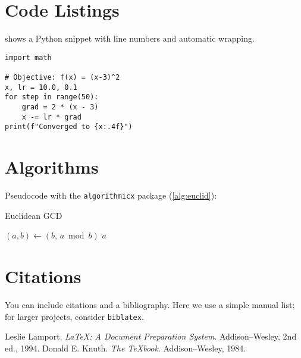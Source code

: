 \documentclass[11pt]{article}
\begin{document}
\section{Code Listings}
 shows a Python snippet with line numbers and automatic wrapping.
\begin{lstlisting}[caption={Tiny gradient descent in Python.},label={lst:python}]
import math

# Objective: f(x) = (x-3)^2
x, lr = 10.0, 0.1
for step in range(50):
    grad = 2 * (x - 3)
    x -= lr * grad
print(f"Converged to {x:.4f}")
\end{lstlisting}

\section{Algorithms}
Pseudocode with the \texttt{algorithmicx} package (\cref{alg:euclid}):
\begin{algorithm}[h]
  \caption{Euclidean GCD}\label{alg:euclid}
  \begin{algorithmic}[1]
        \State $(a,b) \gets (b,\, a \bmod b)$
      \EndWhile
      \State \Return $a$
    \EndProcedure
  \end{algorithmic}
\end{algorithm}

\section{Citations}
You can include citations and a bibliography. Here we use a simple manual list; for larger projects, consider \texttt{biblatex}.

\begin{thebibliography}{9}
 Leslie Lamport. \emph{\LaTeX: A Document Preparation System}. Addison--Wesley, 2nd ed., 1994.
 Donald E. Knuth. \emph{The \TeX book}. Addison--Wesley, 1984.
\end{thebibliography}
\end{document}

